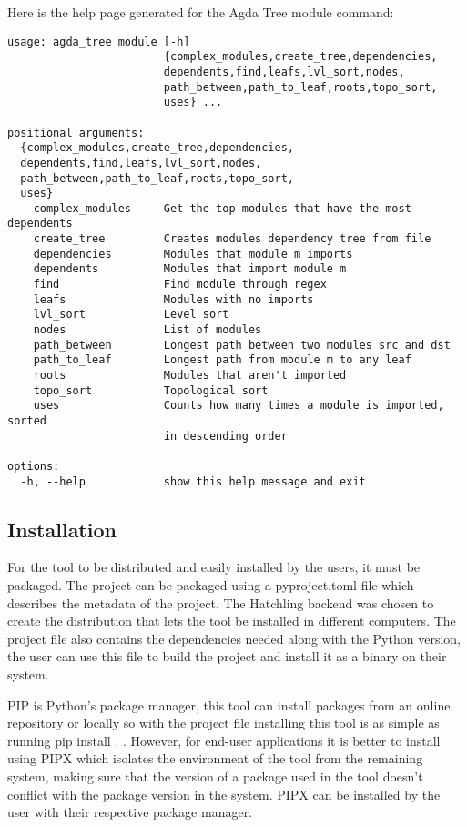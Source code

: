 \noindent
\begin{minipage}{\linewidth}
Here is the help page generated for the Agda Tree module command:

\begin{lstlisting}
usage: agda_tree module [-h]
                        {complex_modules,create_tree,dependencies,
                        dependents,find,leafs,lvl_sort,nodes,
                        path_between,path_to_leaf,roots,topo_sort,
                        uses} ...

positional arguments:
  {complex_modules,create_tree,dependencies,
  dependents,find,leafs,lvl_sort,nodes,
  path_between,path_to_leaf,roots,topo_sort,
  uses}
    complex_modules     Get the top modules that have the most dependents
    create_tree         Creates modules dependency tree from file
    dependencies        Modules that module m imports
    dependents          Modules that import module m
    find                Find module through regex
    leafs               Modules with no imports
    lvl_sort            Level sort
    nodes               List of modules
    path_between        Longest path between two modules src and dst
    path_to_leaf        Longest path from module m to any leaf
    roots               Modules that aren't imported
    topo_sort           Topological sort
    uses                Counts how many times a module is imported, sorted
                        in descending order

options:
  -h, --help            show this help message and exit
\end{lstlisting}
\end{minipage}

\subsection{Installation} \label{sub:Agda Tree Installation}

For the tool to be distributed and easily installed by the users, it must be
packaged. The project can be packaged using a \textsf{pyproject.toml} file
which describes the metadata of the project. The Hatchling backend was chosen
to create the distribution that lets the tool be installed in different
computers. The project file also contains the dependencies needed along with
the Python version, the user can use  this file to build the project and
install it as a binary on their system.

PIP is Python's package manager, this tool can install packages from an online
repository or locally so with the project file installing this tool is as
simple as running \textsf{pip install .} . However, for end-user applications it
is better to install using PIPX which isolates the environment of the tool from
the remaining system, making sure that the version of a package used in the
tool doesn't conflict with the package version in the system. PIPX can be
installed by the user with their respective package manager.


